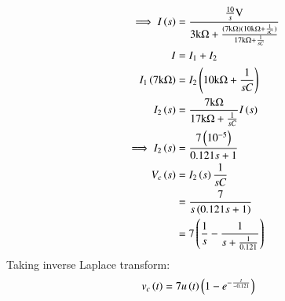 \documentclass[journal,12pt,twocolumn]{IEEEtran}
\theoremstyle{remark}
\begin{document}
\begin{align}
\implies I\left(s\right) &= \frac{\frac{10}{s}\text{V}}{3\text{k}\ohm + \frac{(7\text{k}\ohm)(10\text{k}\ohm + \frac{1}{sC})}{17\text{k}\ohm + \frac{1}{sC}}} \\
I &= I_1 + I_2 \\
I_1\left(7\text{k}\ohm\right) &= I_2\left(10\text{k}\ohm + \frac{1}{sC}\right) \\
I_2\left(s\right) &= \frac{7\text{k}\ohm}{17\text{k}\ohm + \frac{1}{sC}}I\left(s\right) \\
\implies I_2\left(s\right) &= \frac{7\left(10^{-5}\right)}{0.121s + 1} \\
V_c\left(s\right) &= I_2\left(s\right)\frac{1}{sC} \\
&= \frac{7}{s\left(0.121s + 1\right)} \\
&= 7\left(\frac{1}{s} - \frac{1}{s + \frac{1}{0.121}}\right)
\end{align}
Taking inverse Laplace transform:
\begin{align}
v_c\left(t\right) &= 7u\left(t\right)\left(1 - e^{-\frac{t}{-0.121}}\right)
\end{align}
\end{document}
